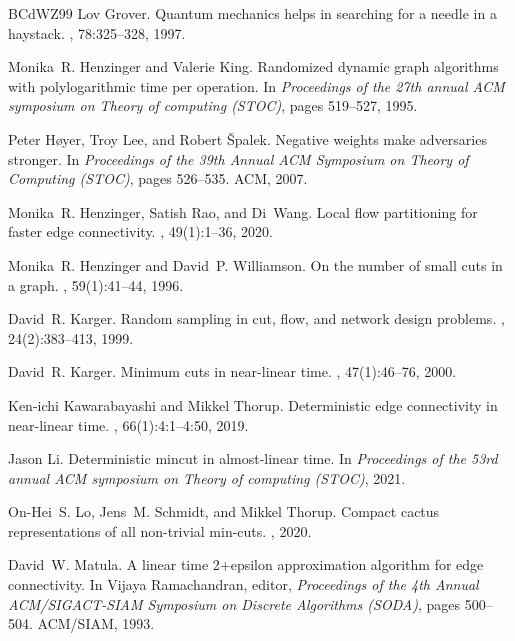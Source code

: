 \begin{thebibliography}{BCdWZ99}
Lov Grover.
\newblock Quantum mechanics helps in searching for a needle in a haystack.
, 78:325--328, 1997.

Monika~R. Henzinger and Valerie King.
\newblock Randomized dynamic graph algorithms with polylogarithmic time per
  operation.
\newblock In {\em Proceedings of the 27th annual ACM symposium on Theory of
  computing (STOC)}, pages 519--527, 1995.

Peter H{\o}yer, Troy Lee, and Robert {\v{S}}palek.
\newblock Negative weights make adversaries stronger.
\newblock In {\em Proceedings of the 39th Annual {ACM} Symposium on Theory of
  Computing (STOC)}, pages 526--535. {ACM}, 2007.

Monika~R. Henzinger, Satish Rao, and Di~Wang.
\newblock Local flow partitioning for faster edge connectivity.
, 49(1):1--36, 2020.

Monika~R. Henzinger and David~P. Williamson.
\newblock On the number of small cuts in a graph.
, 59(1):41--44, 1996.

David~R. Karger.
\newblock Random sampling in cut, flow, and network design problems.
, 24(2):383--413, 1999.

David~R. Karger.
\newblock Minimum cuts in near-linear time.
, 47(1):46--76, 2000.

Ken{-}ichi Kawarabayashi and Mikkel Thorup.
\newblock Deterministic edge connectivity in near-linear time.
, 66(1):4:1--4:50, 2019.

Jason Li.
\newblock Deterministic mincut in almost-linear time.
\newblock In {\em Proceedings of the 53rd annual ACM symposium on Theory of
  computing (STOC)}, 2021.

On-Hei~S. Lo, Jens~M. Schmidt, and Mikkel Thorup.
\newblock Compact cactus representations of all non-trivial min-cuts.
, 2020.

David~W. Matula.
\newblock A linear time 2+epsilon approximation algorithm for edge
  connectivity.
\newblock In Vijaya Ramachandran, editor, {\em Proceedings of the 4th Annual
  {ACM/SIGACT-SIAM} Symposium on Discrete Algorithms (SODA)}, pages 500--504.
  {ACM/SIAM}, 1993.


\end{thebibliography}
